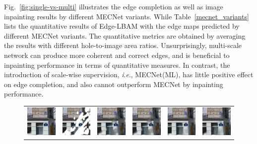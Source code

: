 \documentclass[10pt,journal,compsoc]{IEEEtran}
\newcommand{\ie}{\textit{i}.\textit{e}.}
\begin{document}
Fig.~\ref{fig:single-vs-multi} illustrates the edge completion as well as image inpainting results by different MECNet variants.
%
While Table~\ref{mecnet_variants} lists the quantitative results of Edge-LBAM with the edge maps predicted by different MECNet variants.
%
The quantitative metrics are obtained by averaging the results with different hole-to-image area ratios.
%
Unsurprisingly, multi-scale network can produce more coherent and correct edges, and is beneficial to inpainting performance in terms of quantitative measures.
%
In contrast, the introduction of scale-wise supervision, \ie, MECNet(ML), has little positive effect on edge completion, and also cannot outperform MECNet by inpainting performance.
%
\begin{figure}[hbt]
	\setlength{\tabcolsep}{2.0pt}
	\centering
	\begin{tabular}{cccccc}
		\includegraphics[width=.155\textwidth]{Ablation/LBAM/GT} &
		\includegraphics[width=.155\textwidth]{Ablation/LBAM/input} &
		\includegraphics[width=.155\textwidth]{Ablation/LBAM/BF.png} &
		\includegraphics[width=.155\textwidth]{Ablation/LBAM/BF+BR.png} &
		\includegraphics[width=.155\textwidth]{Ablation/LBAM/LFAM.png} &
		\includegraphics[width=.155\textwidth]{Ablation/LBAM/LFAM+BR.png}  \\

\end{tabular}
\end{figure}
\end{document}
